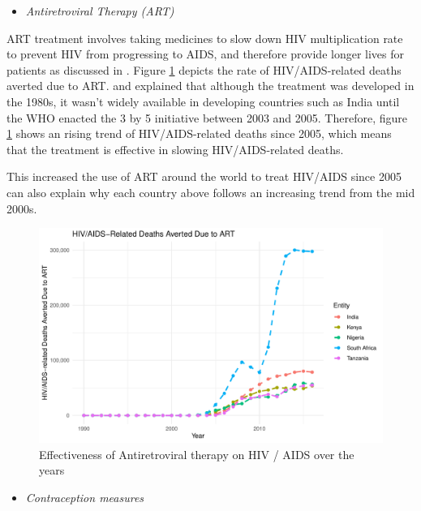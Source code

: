 \documentclass[11pt,a4paper,]{article}
\providecommand{\tightlist}{%
  \setlength{\itemsep}{0pt}\setlength{\parskip}{0pt}}
\begin{document}
\begin{itemize}
\tightlist
\item
  \emph{Antiretroviral Therapy (ART)}
\end{itemize}

ART treatment involves taking medicines to slow down HIV multiplication rate to prevent HIV from progressing to AIDS, and therefore provide longer lives for patients as discussed in \textcite{kemnic2018hiv}. Figure \ref{fig:ARTplot} depicts the rate of HIV/AIDS-related deaths averted due to ART. \textcite{sashindran2016antiretroviral} and \textcite{world2006towards} explained that although the treatment was developed in the 1980s, it wasn't widely available in developing countries such as India until the WHO enacted the 3 by 5 initiative between 2003 and 2005. Therefore, figure \ref{fig:ARTplot} shows an rising trend of HIV/AIDS-related deaths since 2005, which means that the treatment is effective in slowing HIV/AIDS-related deaths.

This increased the use of ART around the world to treat HIV/AIDS since 2005 can also explain why each country above follows an increasing trend from the mid 2000s.

\begin{figure}
\centering
\includegraphics{report_files/figure-latex/ARTplot-1.pdf}
\caption{\label{fig:ARTplot}Effectiveness of Antiretroviral therapy on HIV / AIDS over the years}
\end{figure}

\clearpage

\begin{itemize}
\tightlist
\item
  \emph{Contraception measures}
\end{itemize}
\end{document}
